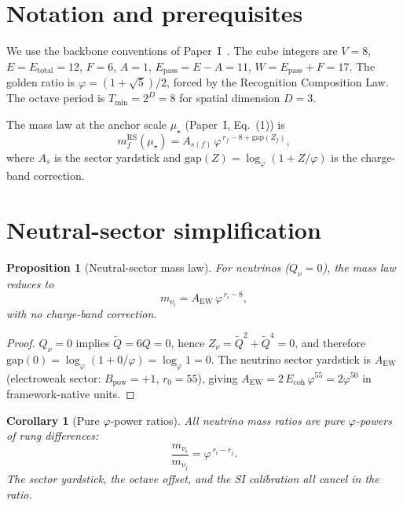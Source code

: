 \documentclass[11pt]{article}
\newtheorem{proposition}[theorem]{Proposition}
\newtheorem{corollary}[theorem]{Corollary}
\theoremstyle{remark}
\newcommand{\phig}{\varphi}
\newcommand{\mustar}{\mu_\star}
\newcommand{\Epass}{E_{\mathrm{pass}}}
\newcommand{\Ecoh}{E_{\mathrm{coh}}}
\newcommand{\Bpow}{B_{\mathrm{pow}}}
\newcommand{\Etot}{E_{\mathrm{total}}}
\begin{document}
\section{Notation and prerequisites}
\label{sec:notation}

We use the backbone conventions of Paper~I~\cite{backbone}.
The cube integers are $V=8$, $E=\Etot=12$, $F=6$, $A=1$,
$\Epass=E-A=11$, $W=\Epass+F=17$.  The golden ratio is
$\phig=(1+\sqrt{5})/2$, forced by the Recognition Composition
Law.  The octave period is $T_{\min}=2^D=8$ for spatial
dimension $D=3$.

The mass law at the anchor scale $\mustar$ (Paper~I,
Eq.~(1)) is
\begin{equation}\label{eq:masslaw}
  m_f^{\mathrm{RS}}(\mustar)
  = A_{s(f)}\,\phig^{\,r_f - 8 + \mathrm{gap}(Z_f)},
\end{equation}
where $A_s$ is the sector yardstick and
$\mathrm{gap}(Z)=\log_\phig(1+Z/\phig)$ is the charge-band
correction.

\section{Neutral-sector simplification}
\label{sec:neutral}

\begin{proposition}[Neutral-sector mass law]
\label{prop:neutral}
For neutrinos ($Q_\nu=0$), the mass law reduces to
\begin{equation}\label{eq:nu_mass}
  m_{\nu_i} = A_{\mathrm{EW}}\,\phig^{\,r_i - 8},
\end{equation}
with no charge-band correction.
\end{proposition}

\begin{proof}
$Q_\nu=0$ implies $\tilde{Q}=6Q=0$, hence
$Z_\nu = \tilde{Q}^2 + \tilde{Q}^4 = 0$, and therefore
$\mathrm{gap}(0) = \log_\phig(1+0/\phig) = \log_\phig 1 = 0$.
The neutrino sector yardstick is $A_{\mathrm{EW}}$
(electroweak sector: $\Bpow=+1$, $r_0=55$), giving
$A_{\mathrm{EW}} = 2\,\Ecoh\,\phig^{55} = 2\phig^{50}$
in framework-native units.
\end{proof}

\begin{corollary}[Pure $\phig$-power ratios]
\label{cor:ratios}
All neutrino mass ratios are pure $\phig$-powers of rung
differences:
\begin{equation}\label{eq:nu_ratio}
  \frac{m_{\nu_i}}{m_{\nu_j}} = \phig^{\,r_i - r_j}.
\end{equation}
The sector yardstick, the octave offset, and the SI calibration
all cancel in the ratio.
\end{corollary}
\end{document}
